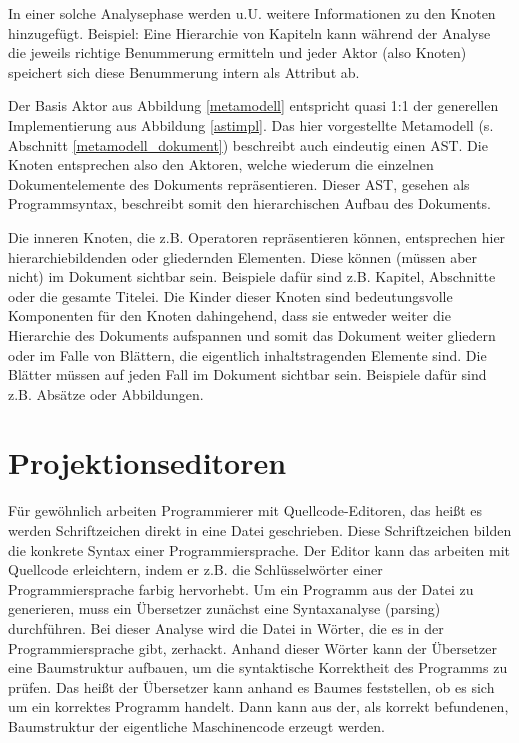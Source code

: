  
In einer solche Analysephase werden u.U. weitere Informationen zu den Knoten hinzugefügt. Beispiel: Eine Hierarchie von Kapiteln kann während der Analyse die jeweils richtige Benummerung ermitteln und jeder Aktor (also Knoten) speichert sich diese Benummerung intern als Attribut ab.

 
Der Basis Aktor aus Abbildung \ref{metamodell} entspricht quasi 1:1 der generellen Implementierung aus Abbildung \ref{astimpl}. Das hier vorgestellte Metamodell (s. Abschnitt \ref{metamodell_dokument}) beschreibt auch eindeutig einen AST. Die Knoten entsprechen also den Aktoren, welche wiederum die einzelnen Dokumentelemente des Dokuments repräsentieren. Dieser AST, gesehen als Programmsyntax, beschreibt somit den hierarchischen Aufbau des Dokuments.

 
Die inneren Knoten, die z.B. Operatoren repräsentieren können, entsprechen hier hierarchiebildenden oder gliedernden Elementen. Diese können (müssen aber nicht) im Dokument sichtbar sein. Beispiele dafür sind z.B. Kapitel, Abschnitte oder die gesamte Titelei. Die Kinder dieser Knoten sind bedeutungsvolle Komponenten für den Knoten dahingehend, dass sie entweder weiter die Hierarchie des Dokuments aufspannen und somit das Dokument weiter gliedern oder im Falle von Blättern, die eigentlich inhaltstragenden Elemente sind. Die Blätter müssen auf jeden Fall im Dokument sichtbar sein. Beispiele dafür sind z.B. Absätze oder Abbildungen.

 
\section{Projektionseditoren}\label{Projektionseditoren-sec}
 
Für gewöhnlich arbeiten Programmierer mit Quellcode-Editoren, das heißt es werden Schriftzeichen direkt in eine Datei geschrieben. Diese Schriftzeichen bilden die konkrete Syntax einer Programmiersprache. Der Editor kann das arbeiten mit Quellcode erleichtern, indem er z.B. die Schlüsselwörter einer Programmiersprache farbig hervorhebt. Um ein Programm aus der Datei zu generieren, muss ein Übersetzer zunächst eine Syntaxanalyse (parsing) durchführen. Bei dieser Analyse wird die Datei in Wörter, die es in der Programmiersprache gibt, zerhackt. Anhand dieser Wörter kann der Übersetzer eine Baumstruktur aufbauen, um die syntaktische Korrektheit des Programms zu prüfen. Das heißt der Übersetzer kann anhand es Baumes feststellen, ob es sich um ein korrektes Programm handelt. Dann kann aus der, als korrekt befundenen, Baumstruktur der eigentliche Maschinencode erzeugt werden.

